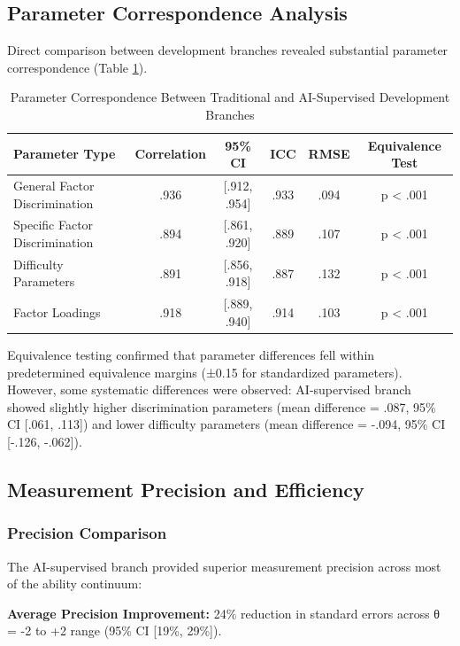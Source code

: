 \documentclass[12pt,a4paper]{article}
\begin{document}
\subsection{Parameter Correspondence Analysis}

Direct comparison between development branches revealed substantial parameter correspondence (Table \ref{tab:branch-comparison}).

\begin{table}[ht]
\centering
\caption{Parameter Correspondence Between Traditional and AI-Supervised Development Branches}
\label{tab:branch-comparison}
\begin{tabular}{lccccc}
\toprule
Parameter Type & Correlation & 95\% CI & ICC & RMSE & Equivalence Test \\
\midrule
General Factor Discrimination & .936 & [.912, .954] & .933 & .094 & p < .001 \\
Specific Factor Discrimination & .894 & [.861, .920] & .889 & .107 & p < .001 \\
Difficulty Parameters & .891 & [.856, .918] & .887 & .132 & p < .001 \\
Factor Loadings & .918 & [.889, .940] & .914 & .103 & p < .001 \\
\bottomrule
\end{tabular}
\end{table}

Equivalence testing confirmed that parameter differences fell within predetermined equivalence margins (±0.15 for standardized parameters). However, some systematic differences were observed: AI-supervised branch showed slightly higher discrimination parameters (mean difference = .087, 95\% CI [.061, .113]) and lower difficulty parameters (mean difference = -.094, 95\% CI [-.126, -.062]).

\subsection{Measurement Precision and Efficiency}

\subsubsection{Precision Comparison}

The AI-supervised branch provided superior measurement precision across most of the ability continuum:

\textbf{Average Precision Improvement:} 24\% reduction in standard errors across θ = -2 to +2 range (95\% CI [19\%, 29\%]).
\end{document}
